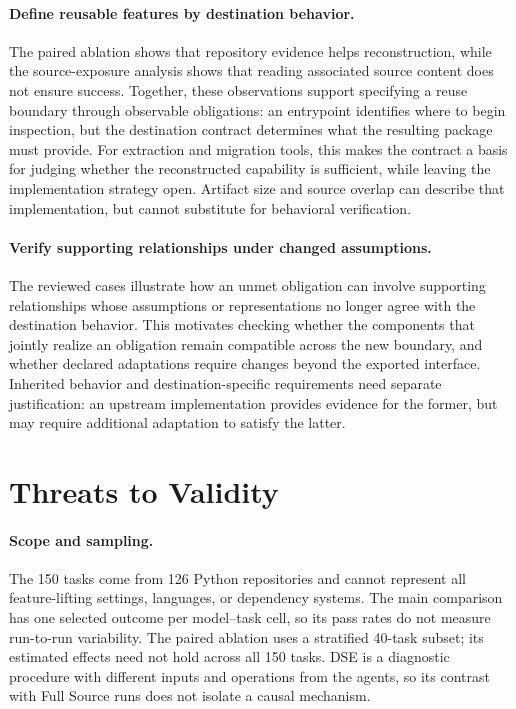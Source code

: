 \documentclass[acmsmall,screen,review,anonymous]{acmart}
\begin{document}
\paragraph{Define reusable features by destination behavior.}
The paired ablation shows that repository evidence helps reconstruction, while
the source-exposure analysis shows that reading associated source content does
not ensure success. Together, these observations support specifying a reuse
boundary through observable obligations: an entrypoint identifies where to
begin inspection, but the destination contract determines what the resulting
package must provide. For extraction and migration tools, this makes the
contract a basis for judging whether the reconstructed capability is sufficient,
while leaving the implementation strategy open. Artifact size and source
overlap can describe that implementation, but cannot substitute for behavioral
verification.

\paragraph{Verify supporting relationships under changed assumptions.}
The reviewed cases illustrate how an unmet obligation can involve supporting
relationships whose assumptions or representations no longer agree with the
destination behavior. This motivates checking whether the components that
jointly realize an obligation remain compatible across the new boundary, and
whether declared adaptations require changes beyond the exported interface.
Inherited behavior and destination-specific requirements need separate
justification: an upstream implementation provides evidence for the former,
but may require additional adaptation to satisfy the latter.

\section{Threats to Validity}
\label{sec:threats}

\paragraph{Scope and sampling.}
The 150 tasks come from 126 Python repositories and cannot represent all
feature-lifting settings, languages, or dependency systems. The main comparison
has one selected outcome per model--task cell, so its pass rates do not measure
run-to-run variability. The paired ablation uses a stratified 40-task subset;
its estimated effects need not hold across all 150 tasks. DSE is a diagnostic
procedure with different inputs and operations from the agents, so its contrast
with Full Source runs does not isolate a causal mechanism.
\end{document}
